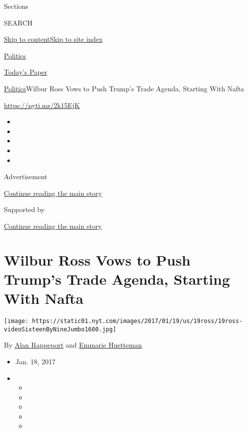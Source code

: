 Sections

SEARCH

\protect\hyperlink{site-content}{Skip to
content}\protect\hyperlink{site-index}{Skip to site index}

\href{https://www.nytimes.com/section/politics}{Politics}

\href{https://myaccount.nytimes.com/auth/login?response_type=cookie\&client_id=vi}{}

\href{https://www.nytimes.com/section/todayspaper}{Today's Paper}

\href{/section/politics}{Politics}\textbar{}Wilbur Ross Vows to Push
Trump's Trade Agenda, Starting With Nafta

\url{https://nyti.ms/2k15EjK}

\begin{itemize}
\item
\item
\item
\item
\item
\end{itemize}

Advertisement

\protect\hyperlink{after-top}{Continue reading the main story}

Supported by

\protect\hyperlink{after-sponsor}{Continue reading the main story}

\hypertarget{wilbur-ross-vows-to-push-trumps-trade-agenda-starting-with-nafta}{%
\section{Wilbur Ross Vows to Push Trump's Trade Agenda, Starting With
Nafta}\label{wilbur-ross-vows-to-push-trumps-trade-agenda-starting-with-nafta}}

\texttt{[image: https://static01.nyt.com/images/2017/01/19/us/19ross/19ross-videoSixteenByNineJumbo1600.jpg]}

By \href{https://www.nytimes.com/by/alan-rappeport}{Alan Rappeport} and
\href{https://www.nytimes.com/by/emmarie-huetteman}{Emmarie Huetteman}

\begin{itemize}
\item
  Jan. 18, 2017
\item
  \begin{itemize}
  \item
  \item
  \item
  \item
  \item
  \end{itemize}
\end{itemize}

